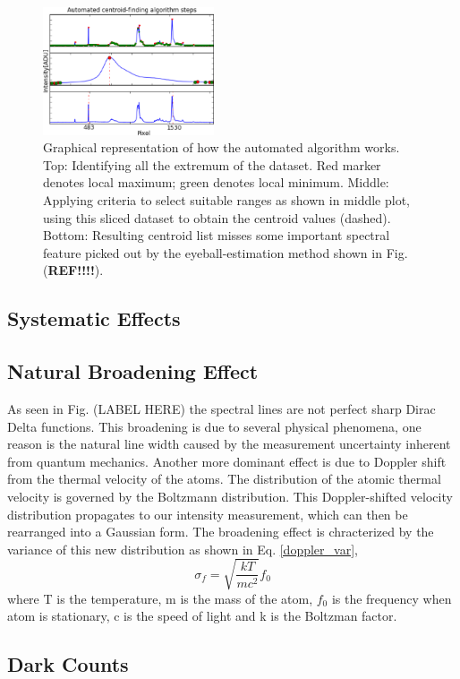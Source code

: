 \documentclass[authoryear, 12pt,5p, times]{elsarticle}
\begin{document}
\begin{figure}
\includegraphics[width=0.45\textwidth]{figures/steps}
\caption{Graphical representation of how the automated algorithm works. Top: Identifying all the extremum of the dataset. Red marker denotes local maximum; green denotes local minimum. Middle: Applying criteria to select suitable ranges as shown in middle plot, using this sliced dataset to obtain the centroid values (dashed). Bottom: Resulting centroid list misses some important spectral feature picked out by the eyeball-estimation method shown in Fig. (\textbf{REF!!!!}).} 
\end{figure}
	\subsection{Systematic Effects}
	 \subsection{Natural Broadening Effect}
 As seen in Fig. (LABEL HERE) the spectral lines are not perfect sharp Dirac Delta functions. This broadening is due to several physical phenomena, one reason is the natural line width caused by the measurement uncertainty inherent from quantum mechanics. Another more dominant effect is due to Doppler shift from the thermal velocity of the atoms. The distribution of the atomic thermal velocity is governed by the Boltzmann distribution. This Doppler-shifted velocity distribution propagates to our intensity measurement, which can then be rearranged into a Gaussian form. The broadening effect is chracterized by the variance of this new distribution as shown in  Eq. \ref{doppler_var},
 \begin{equation}\label{doppler_var}
\sigma_f = \sqrt{\frac{kT}{mc^2}}f_0
 \end{equation}
 where T is the temperature, m is the mass of the atom, $f_0$ is the frequency when atom is stationary, c is the speed of light and k is the Boltzman factor.
 
 \subsection{Dark Counts}
 
\end{document}
